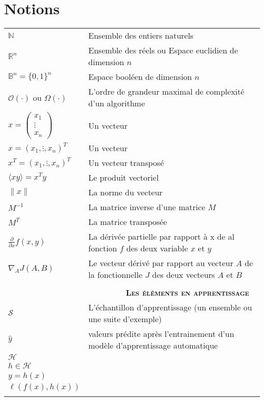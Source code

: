 \chapter*{Notions}

\begin{tabular}{ll}
	$\mathbb{N} $ & Ensemble des entiers naturels\\
	$\mathbb{R}^n $ & Ensemble des réels ou  Espace euclidien de dimension $n$ \\
	$\mathbb{B}^n = \{0,1\}^n $ & Espace booléen de dimension $n$\\
	$\mathcal{O}(\cdot) $ ou $ {\Omega}(\cdot) $ & L'ordre de grandeur maximal de complexité d'un algorithme \\
	
	
	$x = \begin{pmatrix}
		x_1 \\ \vdots \\ x_n 
	\end{pmatrix} $ & Un vecteur\\ 
	$x =  (x_1, \vdots,  x_n)^T$ & Un vecteur \\ 
	$x^T =  (x_1, \vdots,  x_n)^T$ & Un vecteur transposé \\ 
	$ \langle xy\rangle = x^Ty$  & Le produit vectoriel \\ 
	$\parallel x \parallel $ & La norme du vecteur\\
	
	 
	$M^{-1}$ & La matrice inverse d'une matrice $M$\\
	$M^{T}$ & La matrice transposée \\
	
	$\frac{\partial}{\partial x}f(x,y) $ & La dérivée partielle par rapport à x de al fonction $f$ des deux variable $x$ et $y$ \\ 
	
	$\nabla_A J(A,B) $ & Le vecteur dérivé par rapport au vecteur $A$ de la fonctionnelle $J$ des deux vecteurs $A$ et $B$ \\ 
	
	$ $ & \\
	
	 $ $ & \textbf{  \ \ \ \ \ \ \ \ \textsc{Les éléments en apprentissage}} \\
	
	$ \mathcal{S} $ & L'échantillon d'apprentissage (un ensemble ou une suite d'exemple)  \\ 
	$ \hat{y}$ & valeurs prédite après l'entrainement d'un modèle d'apprentissage automatique \\ 
	$ \mathcal{H} $ & \\
	$ h \in \mathcal{H} $ & \\
	$y = h(x) $ & \\
	$ \ell(f(x),h(x)) $ & \\
	
	$ $ & \\
	
\end{tabular}
